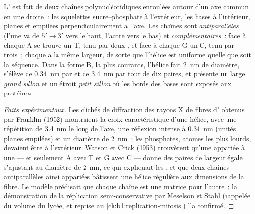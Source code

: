 \begin{theorem}\label{thm:b1:nucleic-acids:helix}
L' est fait de deux chaînes polynucléotidiques enroulées autour d'un
axe commun en une \emph{} droite~: les squelettes
sucre--phosphate à l'extérieur, les bases à l'intérieur, planes et
empilées perpendiculairement à l'axe. Les chaînes sont
\emph{antiparallèles} (l'une va de $5' \to 3'$ vers le haut, l'autre
vers le bas) et \emph{complémentaires}~: face à chaque A se trouve un T,
tenu par deux , et face à chaque G un C, tenu par
trois~; chaque \emph{} a la même largeur, de sorte que
l'hélice est uniforme quelle que soit la séquence. Dans la forme B,
la plus courante, l'hélice fait \qty{2}{nm} de diamètre, s'élève de
\qty{0.34}{nm} par  et de \qty{3.4}{nm} par tour de dix
paires, et présente un large \emph{grand sillon} et un étroit
\emph{petit sillon} où les bords des bases sont exposés aux protéines.
\end{theorem}
\begin{proof}[Faits expérimentaux]
Les clichés de diffraction des rayons X de fibres d' obtenus par
Franklin (1952) montraient la croix caractéristique d'une hélice, avec
une répétition de \qty{3.4}{nm} le long de l'axe, une réflexion intense
à \qty{0.34}{nm} (unités planes empilées) et un diamètre de
\qty{2}{nm}~; les phosphates, atomes les plus lourds, devaient être à
l'extérieur. Watson et Crick (1953) trouvèrent qu'une  appariée à
une  --- et seulement A avec T et G avec C --- donne des
paires de largeur égale s'ajustant au diamètre de \qty{2}{nm}, ce qui
expliquait les , et que deux chaînes antiparallèles
ainsi appariées bâtissent une hélice régulière aux dimensions de la
fibre. Le modèle prédisait que chaque chaîne est une matrice pour
l'autre~; la démonstration de la réplication semi-conservative par
Meselson et Stahl (rappelée du volume du lycée, et reprise au
\cref{ch:b1:replication-mitosis}) l'a confirmé.
\end{proof}

